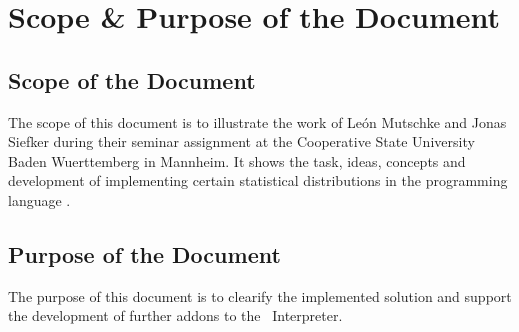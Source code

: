 

\chapter*{Scope \& Purpose of the Document}

\section*{Scope of the Document}
	The scope of this document is to illustrate the work of Le\'{o}n Mutschke and Jonas Siefker during their seminar assignment at the Cooperative State University Baden Wuerttemberg in Mannheim. It shows the task, ideas, concepts and development of implementing certain statistical distributions in the programming language \setlx.

\section*{Purpose of the Document}
	The purpose of this document is to clearify the implemented solution and support the development of further addons to the \setlx\ Interpreter.